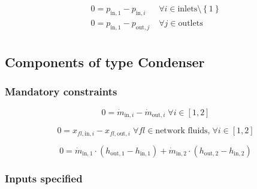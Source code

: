 \begin{equation}
\label{eq:Splitter_pressure_constraints}
\begin{split}
0 = p_\mathrm{in,1} - p_{\mathrm{in,}i} & \; \forall i \in \text{inlets} \setminus \left\lbrace 1\right\rbrace\\
0 = p_\mathrm{in,1} - p_{\mathrm{out,}j} & \; \forall j \in \text{outlets}\\
\end{split}
\end{equation}


\subsection{Components of type Condenser}

\subsubsection{Mandatory constraints}

\begin{equation}
\label{eq:Condenser_mass_flow_constraints}
0=\dot{m}_{\mathrm{in,}i}-\dot{m}_{\mathrm{out,}i}\; \forall i \in [1, 2]
\end{equation}

\begin{equation}
\label{eq:Condenser_fluid_constraints}
0=x_{fl\mathrm{,in,}i}-x_{fl\mathrm{,out,}i}\;\forall fl \in\text{network fluids,}\; \forall i \in [1, 2]
\end{equation}

\begin{equation}
\label{eq:Condenser_energy_balance_constraints}
0 = \dot{m}_\mathrm{in,1} \cdot \left(h_\mathrm{out,1} - h_\mathrm{in,1} \right) +\dot{m}_\mathrm{in,2} \cdot \left(h_\mathrm{out,2} - h_\mathrm{in,2} \right)
\end{equation}


\subsubsection{Inputs specified}

